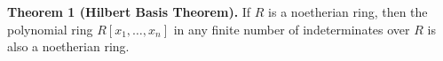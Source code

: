 \textbf{Theorem 1 (Hilbert Basis Theorem).} If $R$ is a noetherian ring, then the polynomial ring $R[x_1, \dots, x_n]$ in any finite number of indeterminates over $R$ is also a noetherian ring.
